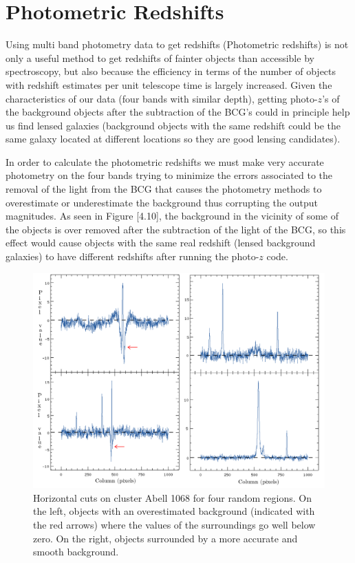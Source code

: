\section{Photometric Redshifts}

Using multi band photometry data to get redshifts (Photometric redshifts) is not only a useful method to get redshifts of fainter objects than accessible by spectroscopy, but also because the efficiency in terms of the number of objects with redshift estimates per unit telescope time is largely increased. Given the characteristics of our data (four bands with similar depth), getting photo-$z$'s of the background objects after the subtraction of the BCG's could in principle help us find lensed galaxies (background objects with the same redshift could be the same galaxy located at different locations so they are good lensing candidates).

In order to calculate the photometric redshifts we must make very accurate photometry on the four bands trying to minimize the errors associated to the removal of the light from the BCG that causes the photometry methods to overestimate or underestimate the background thus corrupting the output magnitudes. As seen in Figure [4.10], the background in the vicinity of some of the objects is over removed after the subtraction of the light of the BCG, so this effect would cause objects with the same real redshift (lensed background galaxies) to have different redshifts after running the photo-$z$ code.

\begin{figure}[H]
\centering
\includegraphics[width=15cm]{images/horizontal_cuts.png}
\caption[Horizontal cuts to show overestimated background on Abell 1068]{Horizontal cuts on cluster Abell 1068 for four random regions. On the left, objects with an overestimated background (indicated with the red arrows) where the values of the surroundings go well below zero. On the right, objects surrounded by a more accurate and smooth background.}
\end{figure}

